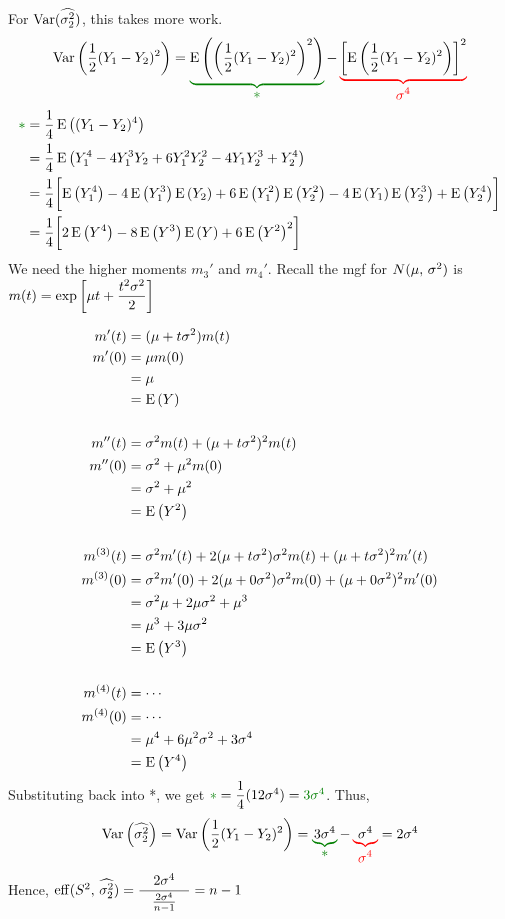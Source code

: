 \nnl For $\Var*{\widehat{\sigma^2_2}}$, this takes more work.
$$\Var{\over{2}(Y_1 - Y_2)^2} = \color{ggreen}\underbrace{\color{black}\E{\pars{\over{2}(Y_1 - Y_2)^2}^2}}_{\displaystyle \ast} \color{black} - \color{red}  \underbrace{\color{black}\brac{\E{\over{2}(Y_1 - Y_2)^2}}^2}_{\displaystyle \sigma^4}$$
\begin{align*}
    {\color{ggreen}\ast} &= \over{4} \E{(Y_1-Y_2)^4}\\
    &= \over{4} \E{Y_1^4   - 4Y_1^3Y_2    + 6Y_1^2Y_2^2    - 4 Y_1Y_2^3  + Y_2^4}\\
    &= \over{4} \biggbrac{\E{Y_1^4}  - 4\E{Y_1^3}\E{Y_2}  + 6\E{Y_1^2}\E{Y_2^2} - 4 \E{Y_1}\E{Y_2^3}  + \E{Y_2^4}}\\
    &= \over{4} \biggbrac{2\E{Y^4}  - 8\E{Y^3}\E{Y}  + 6\E{Y^2}^2}\\
\end{align*}
We need the higher moments $m_3'$ and $m_4'$. Recall the mgf for $\normalDist*$ is $m(t) = \exp \bigg[ {\mu t + \dfrac{t^2 \sigma^2}{2}} \bigg]$

\nl 

\begin{align*}
    m'(t) &= (\mu + t \sigma^2)m(t)\\m'(0) &= \mu m(0) \\ &= \mu \\ &= \E{Y}\\\\
    m''(t) &= \sigma^2 m(t) + (\mu + t \sigma^2)^2 m(t)\\
    m''(0) &= \sigma^2 + \mu^2 m(0) \\ &= \sigma^2 + \mu^2 \\&= \E{Y^2}\\\\
    m^{(3)}(t) &= \sigma^2 m'(t) + 2(\mu + t \sigma^2) \sigma^2 m(t) + (\mu + t \sigma^2)^2 m'(t)\\
    m^{(3)}(0) &= \sigma^2 m'(0) + 2(\mu + 0 \sigma^2) \sigma^2 m(0) + (\mu + 0 \sigma^2)^2 m'(0)\\
    &= \sigma^2 \mu + 2\mu\sigma^2 + \mu^3\\
    &= \mu^3 + 3\mu\sigma^2\\
    &= \E{Y^3}\\\\
    m^{(4)}(t) &= \cdots \\
    m^{(4)}(0) &= \cdots \\
    &=  \mu^4 + 6\mu^2\sigma^2 + 3\sigma^4\\
    &= \E{Y^4}
\end{align*}
Substituting back into {\color{ggreen}*}, we get ${\color{ggreen}*} = \dfrac{1}{4} (12\sigma^4) = {\color{ggreen}3\sigma^4}$. Thus, 
$$\Var{\widehat{\sigma^2_2}} = \Var{\over{2}(Y_1 - Y_2)^2} = \color{ggreen}\underbrace{\color{black}3\sigma^4}_{\displaystyle \ast} \color{black} - \color{red}  \underbrace{\color{black} \sigma^4}_{\displaystyle \sigma^4}\color{black} = 2\sigma^4$$
Hence, $\eff*{S^2,\, \widehat{\sigma^2_2} } = \dfrac{\quad2\sigma^4\quad}{\frac{2\sigma^4}{n-1}} = n-1$
